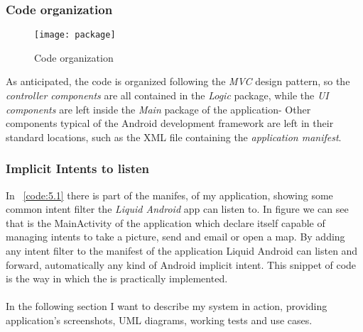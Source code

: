 \subsubsection{Code organization}
\begin{figure}[h]
	\centering
	\texttt{[image: package]}
	\caption{Code organization}
	\label{fig:5.1}
\end{figure}
As anticipated, the code is organized following the \textit{MVC} design pattern, so the \textit{controller components} are all contained in the \textit{Logic} package, while the \textit{UI components} are left inside the \textit{Main} package of the application- Other components typical of the Android development framework are left in their standard locations, such as the XML file containing the \textit{application manifest}.

\subsubsection{Implicit Intents to listen}

In \lstlistingname~\ref{code:5.1} there is part of the manifes, of my application, showing some common intent filter the \textit{Liquid Android} app can listen to. In figure we can see that is the MainActivity of the application which declare itself capable of managing intents to take a picture, send and email or open a map. By adding any intent filter to the manifest of the application Liquid Android can listen and forward, automatically any kind of Android implicit intent. This snippet of code is the way in which the  is practically implemented.\\\\
In the following section I want to describe my system in action, providing application's screenshots, UML diagrams, working tests and use cases.
